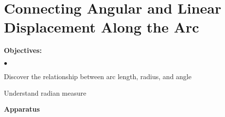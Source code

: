 
\section{Connecting Angular and Linear Displacement Along the Arc}

\makelabheader %

{\noindent \bf Objectives:}

\begin{list}{$\bullet$}{\itemsep0pt }

\item Discover the relationship between arc length, radius, and angle \item Understand radian measure

\end{list}

\textbf{Apparatus}

